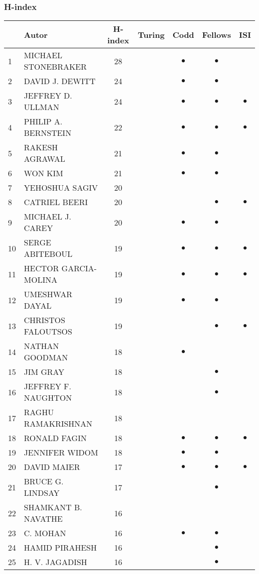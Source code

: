\documentclass[12pt,titlepage]{report}
\begin{document}
\subsubsection{H-index}
\begin{center}
\begin{tabular}{|l|l|c|c|c|c|c|}
\hline
& {\bf Autor} & {\bf H-index} & {\bf Turing} & {\bf Codd} & {\bf Fellows} & {\bf ISI} \\
\hline
1 & MICHAEL STONEBRAKER & 28& & $\bullet$ & $\bullet$ &         \\
\hline
2 & DAVID J. DEWITT & 24& & $\bullet$ & $\bullet$ &         \\
\hline
3 & JEFFREY D. ULLMAN & 24& & $\bullet$ & $\bullet$ & $\bullet$ \\
\hline
4 & PHILIP A. BERNSTEIN & 22& & $\bullet$ & $\bullet$ & $\bullet$ \\
\hline
5 & RAKESH AGRAWAL & 21& & $\bullet$ & $\bullet$ &         \\
\hline
6 & WON KIM & 21& & $\bullet$ & $\bullet$ &         \\
\hline
7 & YEHOSHUA SAGIV & 20& &         &         &         \\
\hline
8 & CATRIEL BEERI & 20& &         & $\bullet$ & $\bullet$ \\
\hline
9 & MICHAEL J. CAREY & 20& & $\bullet$ & $\bullet$ &         \\
\hline
10 & SERGE ABITEBOUL & 19& & $\bullet$ & $\bullet$ & $\bullet$ \\
\hline
11 & HECTOR GARCIA-MOLINA & 19& & $\bullet$ & $\bullet$ & $\bullet$ \\
\hline
12 & UMESHWAR DAYAL & 19& & $\bullet$ & $\bullet$ &         \\
\hline
13 & CHRISTOS FALOUTSOS & 19& &         & $\bullet$ & $\bullet$ \\
\hline
14 & NATHAN GOODMAN & 18& & $\bullet$ &         &         \\
\hline
15 & JIM GRAY & 18& &         & $\bullet$ &         \\
\hline
16 & JEFFREY F. NAUGHTON & 18& &         & $\bullet$ &         \\
\hline
17 & RAGHU RAMAKRISHNAN & 18& &         &         &         \\
\hline
18 & RONALD FAGIN & 18& & $\bullet$ & $\bullet$ & $\bullet$ \\
\hline
19 & JENNIFER WIDOM & 18& & $\bullet$ & $\bullet$ &         \\
\hline
20 & DAVID MAIER & 17& & $\bullet$ & $\bullet$ & $\bullet$ \\
\hline
21 & BRUCE G. LINDSAY & 17& &         & $\bullet$ &         \\
\hline
22 & SHAMKANT B. NAVATHE & 16& &         &         &         \\
\hline
23 & C. MOHAN & 16& & $\bullet$ & $\bullet$ &         \\
\hline
24 & HAMID PIRAHESH & 16& &         & $\bullet$ &         \\
\hline
25 & H. V. JAGADISH & 16& &         & $\bullet$ &         \\
\hline
\end{tabular}
\end{center}
\end{document}
